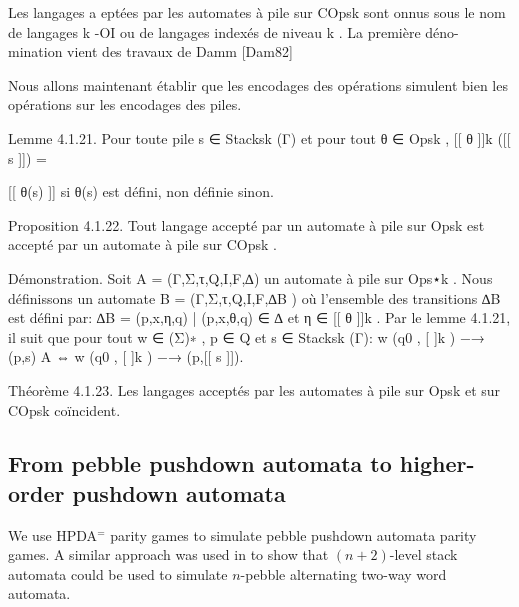 \documentclass[a4paper,UKenglish,cleveref, autoref, thm-restate]{lipics-v2021}
\begin{document}
Les langages a eptées par les automates à pile sur COpsk sont onnus sous
le nom de langages k -OI ou de langages indexés de niveau k . La première déno-
mination vient des travaux de Damm [Dam82]

Nous allons maintenant établir que les encodages des opérations simulent bien
les opérations sur les encodages des piles.

Lemme 4.1.21. Pour toute pile s ∈ Stacksk (Γ) et pour tout θ ∈ Opsk ,
[[ θ ]]k ([[ s ]]) =
{
[[ θ(s) ]]		si θ(s) est défini,	
non définie		sinon.


Proposition 4.1.22. Tout langage accepté par un automate à pile sur Opsk est
accepté par un automate à pile sur COpsk .

Démonstration. Soit A = (Γ,Σ,τ,Q,I,F,∆) un automate à pile sur Ops⋆k . Nous
définissons un automate B = (Γ,Σ,τ,Q,I,F,∆B ) où l'ensemble des transitions ∆B
est défini par:
∆B = {(p,x,η,q) | (p,x,θ,q) ∈ ∆ et η ∈ [[ θ ]]k }.
Par le lemme 4.1.21, il suit que pour tout w ∈ (Σ)∗ , p ∈ Q et s ∈ Stacksk (Γ):
w
(q0 , [ ]k ) −→ (p,s)
A
⇔
w
(q0 , [ ]k ) −→ (p,[[ s ]]).

Théorème 4.1.23. Les langages acceptés par les automates à pile sur Opsk et
sur COpsk coïncident.


\fi




\subsection{From pebble pushdown 
automata 
to higher-order pushdown 
automata
}



We use HPDA$^=$ parity games to simulate pebble pushdown automata
parity games.
A similar approach was used in \cite{carayol2006automates} to show that $(n + 2)$-level stack
automata could be used to simulate $n$-pebble alternating two-way word automata.


}
\end{document}
